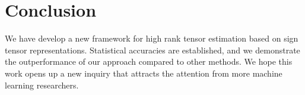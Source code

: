 \documentclass{article}
\theoremstyle{plain}
\theoremstyle{definition}
\begin{document}
\section{Conclusion}
We have develop a new framework for high rank tensor estimation based on sign tensor representations. Statistical accuracies are established, and we demonstrate the outperformance of our approach compared to other methods. %
We hope this work opens up a new inquiry that attracts the attention from more machine learning researchers.





\appendix
\end{document}
